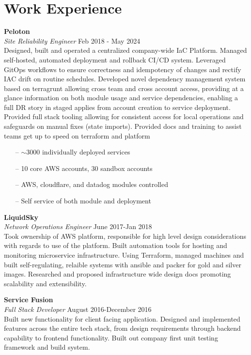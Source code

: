 \section{Work Experience}

\large{\textbf{Peloton}} \\
\textit{Site Reliability Engineer} \hfill Feb 2018 - May 2024 \\[3.75pt]
Designed, built and operated a centralized company-wide IaC Platform. Managed self-hosted, automated deployment and rollback CI/CD system. Leveraged GitOps workflows to ensure correctness and idempotency of changes and rectify IAC drift on routine schedules. Developed novel dependency management system based on terragrunt allowing cross team and cross account access, providing at a glance information on both module usage and service dependencies, enabling a full DR story in staged applies from account creation to service deployment. Provided full stack tooling allowing for consistent access for local operations and safeguards on manual fixes (state imports). Provided docs and training to assist teams get up to speed on terraform and platform


\begin{minipage}[t]{\linewidth}
    \begin{itemize}
        \item[--] $\sim$3000 individually deployed services
        \item[--] 10 core AWS accounts, 30 sandbox accounts
        \item[--] AWS, cloudflare, and datadog modules controlled
        \item[--] Self service of both module and deployment
    \end{itemize}
    \end{minipage}

\large{\textbf{LiquidSky}} \\
\textit{Network Operations Engineer} \hfill June 2017-Jan 2018 \\[3.75pt]
Took ownership of AWS platform, responsible for high level design considerations with regards to use of the platform. Built automation tools for hosting and monitoring microservice infrastructure. Using Terraform, managed machines and built self-regulating, relaible systems with ansible and packer for gold and silver images. Researched and proposed infrastructure wide design docs promoting scalability and extensibility.

\large{\textbf{Service Fusion}} \\
\textit{Full Stack Developer} \hfill August 2016-December 2016 \\[3.75pt]
Built new functionality for client facing application. Designed and implemented features across the entire tech stack, from design requirements through backend capability to frontend functionality. Built out company first unit testing framework and build system.

